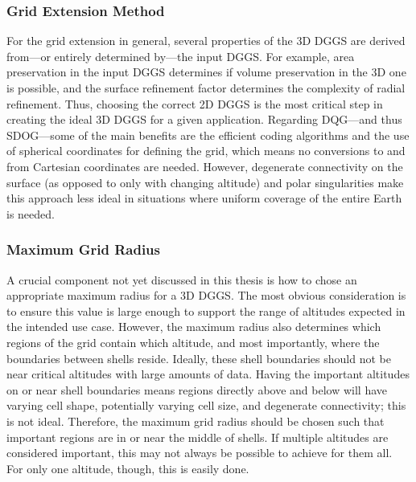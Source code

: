 \subsubsection{Grid Extension Method}
For the grid extension in general, several properties of the 3D DGGS are derived from---or entirely determined by---the input DGGS.
For example, area preservation in the input DGGS determines if volume preservation in the 3D one is possible, and the surface refinement factor determines the complexity of radial refinement.
Thus, choosing the correct 2D DGGS is the most critical step in creating the ideal 3D DGGS for a given application.
Regarding DQG---and thus SDOG---some of the main benefits are the efficient coding algorithms and the use of spherical coordinates for defining the grid, which means no conversions to and from Cartesian coordinates are needed.
However, degenerate connectivity on the surface (as opposed to only with changing altitude) and polar singularities make this approach less ideal in situations where uniform coverage of the entire Earth is needed.


\subsubsection{Maximum Grid Radius}
A crucial component not yet discussed in this thesis is how to chose an appropriate maximum radius for a 3D DGGS.
The most obvious consideration is to ensure this value is large enough to support the range of altitudes expected in the intended use case.
However, the maximum radius also determines which regions of the grid contain which altitude, and most importantly, where the boundaries between shells reside.
Ideally, these shell boundaries should not be near critical altitudes with large amounts of data.
Having the important altitudes on or near shell boundaries means regions directly above and below will have varying cell shape, potentially varying cell size, and degenerate connectivity; this is not ideal.
Therefore, the maximum grid radius should be chosen such that important regions are in or near the middle of shells.
If multiple altitudes are considered important, this may not always be possible to achieve for them all.
For only one altitude, though, this is easily done.


